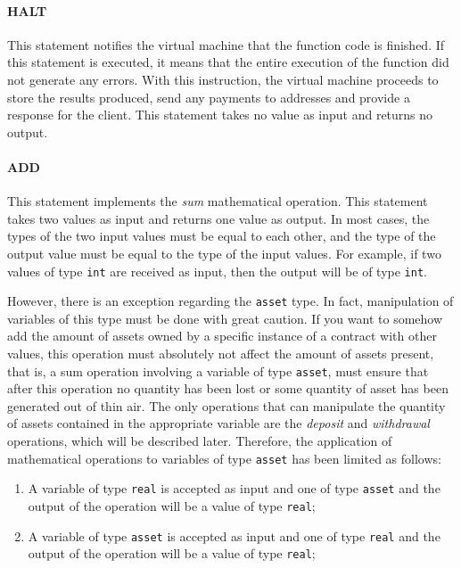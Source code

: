 \paragraph{HALT}

This statement notifies the virtual machine that the function code is finished. If this statement is 
executed, it means that the entire execution of the function did not generate any errors. With this 
instruction, the virtual machine proceeds to store the results produced, send any payments to addresses 
and provide a response for the client. This statement takes no value as input and returns no output.

\paragraph{ADD}

This statement implements the \textit{sum} mathematical operation. This statement takes two values as 
input and returns one value as output. In most cases, the types of the two input values must be equal to 
each other, and the type of the output value must be equal to the type of the input values. For example, 
if two values of type \verb|int| are received as input, then the output will be of type \verb|int|.

However, there is an exception regarding the \verb|asset| type. In fact, manipulation of variables of this 
type must be done with great caution. If you want to somehow add the amount of assets owned by a specific 
instance of a contract with other values, this operation must absolutely not affect the amount of assets 
present, that is, a sum operation involving a variable of type \verb |asset|, must ensure that after this 
operation no quantity has been lost or some quantity of asset has been generated out of thin air. The only 
operations that can manipulate the quantity of assets contained in the appropriate variable are the 
\textit{deposit} and \textit{withdrawal} operations, which will be described later. Therefore, the 
application of mathematical operations to variables of type \verb|asset| has been limited as follows:
\begin{enumerate}
  \item A variable of type \verb|real| is accepted as input and one of type \verb|asset| and the output 
  of the operation will be a value of type \verb|real|;
  \item A variable of type \verb|asset| is accepted as input and one of type \verb|real| and the output 
  of the operation will be a value of type \verb|real|;
\end{enumerate}

